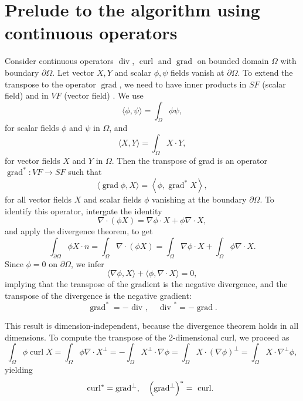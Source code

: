 \documentclass{article}
\numberwithin{equation}{section}
\begin{document}
\pagebreak
\section{Prelude to the algorithm using continuous operators}\label{sec:algorithm-prelude}


Consider continuous operators $\operatorname{div}$, $\operatorname{curl}$ and $\operatorname{grad}$ on bounded domain $\Omega$ with boundary $\partial \Omega$. Let vector  $X,Y$ and scalar $\phi,\psi$ fields vanish at $\partial \Omega$. To extend the transpose to the operator $\operatorname{grad}$, we need to have inner products in $S F$ (scalar field) and in $V F$ (vector field) \cite{Gamtumur:2019}. We use
$$
\langle\phi, \psi\rangle=\int_{\Omega} \phi \psi,
$$
for scalar fields $\phi$ and $\psi$ in $\Omega$, and
$$
\langle X, Y\rangle=\int_{\Omega} X \cdot Y,
$$
for vector fields $X$ and $Y$ in $\Omega$. Then the transpose of grad is an operator $\operatorname{grad}^*: V F \rightarrow S F$ such that
$$
\langle  \operatorname{grad} \phi,X\rangle=\left\langle\phi, \operatorname{grad}^* X\right\rangle,
$$
for all vector fields $X$ and scalar fields $\phi$ vanishing at the boundary $\partial \Omega$. To identify this operator, intergate the identity
$$
\nabla \cdot(\phi X)= \nabla \phi\cdot X+ \phi \nabla \cdot X,
$$
and apply the divergence theorem, to get
$$
\int_{\partial \Omega} \phi X \cdot n=\int_{\Omega} \nabla \cdot(\phi X)=\int_{\Omega} \nabla \phi\cdot X +\int_{\Omega} \phi \nabla \cdot X .
$$
Since $\phi=0$ on $\partial \Omega$, we infer
$$
\langle \nabla \phi,X\rangle+\langle\phi, \nabla \cdot X\rangle=0,
$$
implying that the transpose of the gradient is the negative divergence, and the transpose of the divergence is the negative gradient:
\begin{equation}\label{eqn:curl-grad}
\operatorname{grad}^*=- \text { div }, \quad \text { div }^*=-\operatorname{grad} .
\end{equation}

This result is dimension-independent, because the divergence theorem holds in all dimensions. To compute the transpose of the 2-dimensional curl, we proceed as
$$
\int_{\Omega} \phi \operatorname{curl} X=\int_{\Omega} \phi \nabla \cdot X^{\perp}=-\int_{\Omega} X^{\perp} \cdot \nabla \phi=\int_{\Omega} X \cdot(\nabla \phi)^{\perp}=\int_{\Omega} X \cdot \nabla^{\perp} \phi,
$$
yielding
\begin{equation}
\operatorname{curl}^*=\operatorname{grad}^{\perp}, \quad\left(\operatorname{grad}^{\perp}\right)^*=\text { curl. }\notag
\end{equation}
\end{document}
